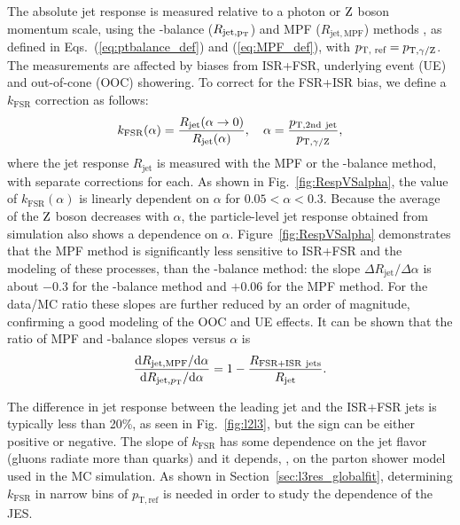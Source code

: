 \documentclass[11pt,twoside,a4paper,cmspaper,final,collab]{cms-tdr}
\begin{document}
The absolute jet response is measured relative to a photon or $\mathrm{Z}$ boson momentum scale, using the \pt-balance ($R_\mathrm{jet, p_{\mathrm{T}}}$) and MPF ($R_\mathrm{jet, MPF}$) methods \cite{JEC_JINST}, as defined
in Eqs.~(\ref{eq:ptbalance_def}) and (\ref{eq:MPF_def}), with $p_\text{T, ref}=p_{\mathrm{T}, \gamma/\mathrm{Z}}$.
The measurements are affected by biases from ISR+FSR, underlying event (UE) and out-of-cone (OOC) showering.
To correct for the FSR+ISR bias, we define a $k_\mathrm{FSR}$ correction as follows:
\begin{equation}\label{eq:krad}
k_\mathrm{FSR}(\alpha) = \frac{R_\text{jet}(\alpha\to 0)}{R_\text{jet}(\alpha)},
\quad \alpha=\frac{p_{\mathrm{T}, \mathrm{2nd~jet}}}{p_{\mathrm{T}, \gamma/\mathrm{Z}}},
\end{equation}
where the jet response $R_\text{jet}$ is measured with the MPF or the \pt-balance method, with separate corrections for each.
As shown in Fig.~\ref{fig:RespVSalpha}, the value of $k_\mathrm{FSR}(\alpha)$ is linearly dependent on $\alpha$ for $0.05<\alpha<0.3$.
Because the average \pt of the $\mathrm{Z}$ boson decreases with $\alpha$, the particle-level jet response obtained from simulation also shows a dependence on $\alpha$.
Figure~\ref{fig:RespVSalpha} demonstrates that the MPF method is significantly less sensitive to ISR+FSR and the modeling of these processes, than the \pt-balance method: the slope $\Delta R_\text{jet} / \Delta\alpha$ is about $-0.3$ for the \pt-balance method and $+0.06$ for the MPF method.
For the data/MC ratio these slopes are further reduced by an order of magnitude, confirming a good modeling of the OOC and UE effects.
It can be shown that the ratio of MPF and \pt-balance slopes versus $\alpha$ is
\begin{equation}
\frac{ \mathrm{d} R_{\text{jet}, \mathrm{MPF}}/ \mathrm{d} \alpha}{ \mathrm{d} R_{\text{jet}, p_{\mathrm{T}}}/ \mathrm{d} \alpha} =
1 - \frac{R_\mathrm{FSR+ISR~jets}}{R_\text{jet}}.
\end{equation}

The difference in jet response between the leading jet and the ISR+FSR jets is typically less than 20\%,
as seen in Fig.~\ref{fig:l2l3}, but the sign can be either positive or negative.
The slope of $k_\mathrm{FSR}$ has some dependence on the jet flavor (gluons radiate more than quarks) and it depends, \eg, on the parton shower model used in the MC simulation. As shown in Section~\ref{sec:l3res_globalfit}, determining $k_\mathrm{FSR}$ in narrow bins of $p_\mathrm{T, ref}$ is needed in order to study the \pt dependence of the JES.
\end{document}
